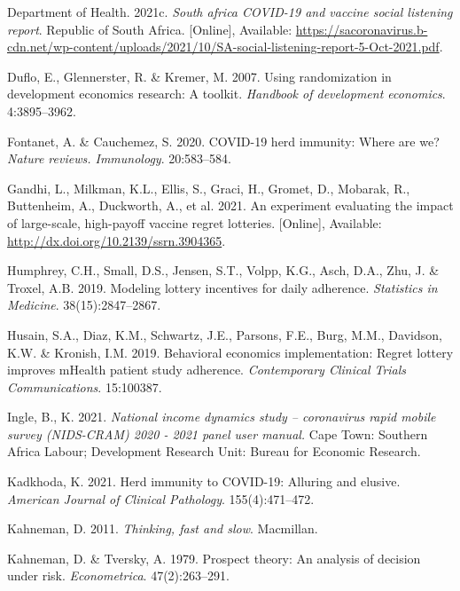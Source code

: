 \documentclass[11pt,preprint, authoryear]{elsarticle}
\numberwithin{equation}{section}
\numberwithin{figure}{section}
\numberwithin{table}{section}
\newlength{\cslhangindent}
\newenvironment{CSLReferences}%
  {\setlength{\parindent}{0pt}%
  \everypar{\setlength{\hangindent}{\cslhangindent}}\ignorespaces}%
  {\par}
\begin{document}
\begin{CSLReferences}{1}{0}
\leavevmode\hypertarget{ref-report}{}%
Department of Health. 2021c. \emph{South africa COVID-19 and vaccine
social listening report}. Republic of South Africa. {[}Online{]},
Available:
\url{https://sacoronavirus.b-cdn.net/wp-content/uploads/2021/10/SA-social-listening-report-5-Oct-2021.pdf}.

\leavevmode\hypertarget{ref-random}{}%
Duflo, E., Glennerster, R. \& Kremer, M. 2007. Using randomization in
development economics research: A toolkit. \emph{Handbook of development
economics}. 4:3895--3962.

\leavevmode\hypertarget{ref-immun}{}%
Fontanet, A. \& Cauchemez, S. 2020. COVID-19 herd immunity: Where are
we? \emph{Nature reviews. Immunology}. 20:583--584.

\leavevmode\hypertarget{ref-duck}{}%
Gandhi, L., Milkman, K.L., Ellis, S., Graci, H., Gromet, D., Mobarak,
R., Buttenheim, A., Duckworth, A., et al. 2021. An experiment evaluating
the impact of large-scale, high-payoff vaccine regret lotteries.
{[}Online{]}, Available: \url{http://dx.doi.org/10.2139/ssrn.3904365}.

\leavevmode\hypertarget{ref-adhere}{}%
Humphrey, C.H., Small, D.S., Jensen, S.T., Volpp, K.G., Asch, D.A., Zhu,
J. \& Troxel, A.B. 2019. Modeling lottery incentives for daily
adherence. \emph{Statistics in Medicine}. 38(15):2847--2867.

\leavevmode\hypertarget{ref-regr}{}%
Husain, S.A., Diaz, K.M., Schwartz, J.E., Parsons, F.E., Burg, M.M.,
Davidson, K.W. \& Kronish, I.M. 2019. Behavioral economics
implementation: Regret lottery improves mHealth patient study adherence.
\emph{Contemporary Clinical Trials Communications}. 15:100387.

\leavevmode\hypertarget{ref-nids}{}%
Ingle, B., K. 2021. \emph{National income dynamics study -- coronavirus
rapid mobile survey (NIDS-CRAM) 2020 - 2021 panel user manual.} Cape
Town: Southern Africa Labour; Development Research Unit: Bureau for
Economic Research.

\leavevmode\hypertarget{ref-bad}{}%
Kadkhoda, K. 2021. Herd immunity to COVID-19: Alluring and elusive.
\emph{American Journal of Clinical Pathology}. 155(4):471--472.

\leavevmode\hypertarget{ref-fast}{}%
Kahneman, D. 2011. \emph{Thinking, fast and slow}. Macmillan.

\leavevmode\hypertarget{ref-prospect}{}%
Kahneman, D. \& Tversky, A. 1979. Prospect theory: An analysis of
decision under risk. \emph{Econometrica}. 47(2):263--291.


\end{CSLReferences}
\end{document}
